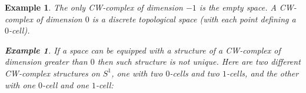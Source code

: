 \documentclass[11pt, letterpaper, oneside]{report}
\theoremstyle{pplain}
\theoremstyle{ddefinition}
\newtheorem{example}[theorem]{Example}
\theoremstyle{nnn}
\theoremstyle{eexercise}
\begin{document}
\begin{example} The only CW-complex of dimension $-1$ is the empty space. A CW-complex of 
dimension $0$ is a discrete topological space (with each point defining a $0$-cell). 


\begin{example}
If a space can be equipped with a structure of a CW-complex of dimension greater than $0$ then such 
structure is not unique. Here  are two different CW-complex structures on $S^{1}$, one  with two $0$-cells and 
two $1$-cells, and  the other with one $0$-cell and one $1$-cell:
\end{example}


\end{example}
\end{document}
